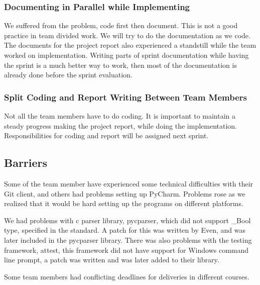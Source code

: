 \subsubsection{Documenting in Parallel while Implementing}
We suffered from the problem, code first then document. This is not a good
practice in team divided work. We will try to do the documentation as we code.
The documents for the project report also experienced a standstill while the
team worked on implementation. Writing parts of sprint documentation while
having the sprint is a much better way to work, then most of the
documentation is already done before the sprint evaluation.

\subsubsection{Split Coding and Report Writing Between Team Members} 
Not all the team members have to do coding. It is important to maintain a
steady progress making the project report, while doing the implementation. 
Responsibilities for coding and report will be assigned next sprint. 

\subsection{Barriers}
Some of the team member have experienced some technical difficulties with their
Git client, and others had problems setting up PyCharm. Problems rose as we
realized that it would be hard setting up the programs on different
platforms.

We had problems with \Gls{c} \gls{parser} \gls{library}, \gls{pycparser}, which did not support \_Bool
type, specified in the  standard. A patch for this was written by Even, and
was later included in the \gls{pycparser} \gls{library}. There was also problems with the
testing framework, attest, this framework did not have support for Windows
command line prompt, a patch was written and was later added to their \gls{library}.

Some team members had conflicting deadlines for deliveries in different courses.

